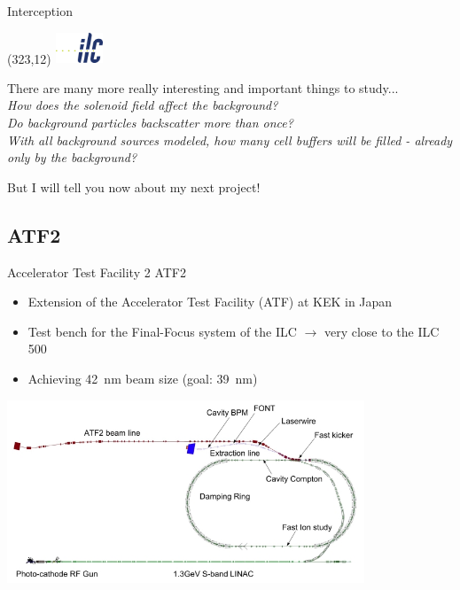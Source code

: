 \documentclass[xcolor={dvipsnames}]{beamer}
\newcommand{\ilclogo}{
  \setlength{\TPHorizModule}{1pt}
  \setlength{\TPVertModule}{1pt}
  \begin{textblock}{1}(323,12)
   \includegraphics[width=40pt,height=26pt]{figures/ILC.jpeg}
  \end{textblock}
}
\begin{document}
\begin{frame}{Interception}
\ilclogo
 \begin{center}
  There are many more really interesting and important things to study...\\
  \vspace*{1cm}
  \textit{How does the solenoid field affect the background?\\
  Do background particles backscatter more than once?\\
  With all background sources modeled, how many cell buffers will be filled - already only by the background?}
 \end{center}
 \vspace*{1cm}
  But I will tell you now about my next project!
\end{frame}


\subsection{ATF2}
\begin{frame}{Accelerator Test Facility 2}
ATF2
\begin{itemize}
\item Extension of the Accelerator Test Facility (ATF) at KEK in Japan
\item Test bench for the Final-Focus system of the ILC $\rightarrow$ very close to the ILC 500
\item Achieving \SI{42}{\nano\metre} beam size (goal: \SI{39}{\nano\metre})
\end{itemize}
\vspace*{0.3cm}
\begin{center}
 	\includegraphics[width=0.8\textwidth]{figures/ATF.jpg}
\end{center}

\end{frame}
\end{document}
